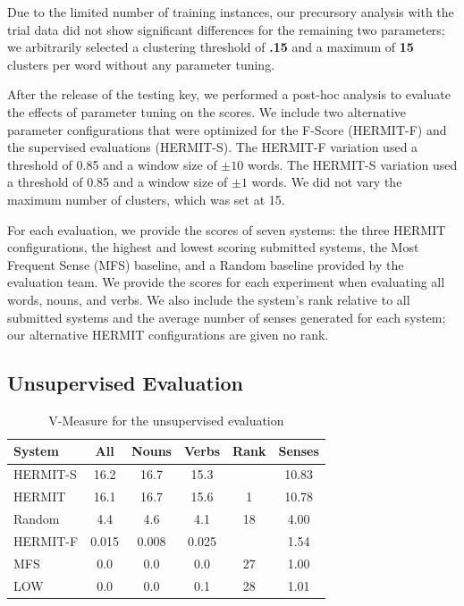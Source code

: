 \documentclass[11pt,a4]{article}
\begin{document}
Due to the limited number of training instances, our precursory analysis with
the trial data did not show significant differences for the remaining two
parameters; we arbitrarily selected a clustering threshold of {\bf .15} and a
maximum of {\bf 15} clusters per word without any parameter tuning.

After the release of the testing key, we performed a post-hoc analysis to
evaluate the effects of parameter tuning on the scores.  We include two
alternative parameter configurations that were optimized for the F-Score
(HERMIT-F) and the supervised evaluations (HERMIT-S).  The HERMIT-F variation
used a threshold of 0.85 and a window size of $\pm 10$ words.  The HERMIT-S
variation used a threshold of 0.85 and a window size of $\pm 1$ words.  We did
not vary the maximum number of clusters, which was set at 15.

For each evaluation, we provide the scores of seven systems: the three HERMIT
configurations, the highest and lowest scoring submitted systems, the Most
Frequent Sense (MFS) baseline, and a Random baseline provided by the evaluation
team.  We provide the scores for each experiment when evaluating all words,
nouns, and verbs.  We also include the system's rank relative to all submitted
systems and the average number of senses generated for each system; our
alternative HERMIT configurations are given no rank.


\subsection{Unsupervised Evaluation}


\begin{table}[htb]
  \small
  \center
  \begin{tabular}{| l | ccccc | }
    \hline
    System & All & Nouns & Verbs & Rank & Senses \\
    \hline
    HERMIT-S & 16.2 & 16.7 & 15.3 & & 10.83 \\
    HERMIT   & 16.1 & 16.7 & 15.6 & 1 & 10.78 \\
    Random   & 4.4  & 4.6  & 4.1 & 18 & 4.00 \\
    HERMIT-F & 0.015 & 0.008 & 0.025 & & 1.54 \\
    MFS      & 0.0  & 0.0 & 0.0 & 27 & 1.00 \\
    LOW      & 0.0  & 0.0 & 0.1 & 28 & 1.01 \\
    \hline
  \end{tabular}
  \caption{V-Measure for the unsupervised evaluation}
  \label{tab:evaluation-v}
\end{table}
\end{document}
